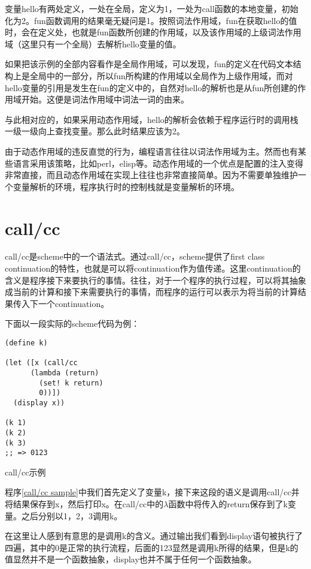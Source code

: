变量hello有两处定义，一处在全局，定义为1，一处为call函数的本地变量，初始化为2。fun函数调用的结果毫无疑问是1。按照词法作用域，fun在获取hello的值时，会在定义处，也就是fun函数所创建的作用域，以及该作用域的上级词法作用域（这里只有一个全局）去解析hello变量的值。

如果把该示例的全部内容看作是全局作用域，可以发现，fun的定义在代码文本结构上是全局中的一部分，所以fun所构建的作用域以全局作为上级作用域，而对hello变量的引用是发生在fun的定义中的，自然对hello的解析也是从fun所创建的作用域开始。这便是词法作用域中词法一词的由来。

与此相对应的，如果采用动态作用域，hello的解析会依赖于程序运行时的调用栈一级一级向上查找变量。那么此时结果应该为2。

由于动态作用域的违反直觉的行为，编程语言往往以词法作用域为主。然而也有某些语言采用该策略，比如perl，elisp等。动态作用域的一个优点是配置的注入变得非常直接，而且动态作用域在实现上往往也非常直接简单。因为不需要单独维护一个变量解析的环境，程序执行时的控制栈就是变量解析的环境。

\section{call/cc}

call/cc是scheme中的一个语法式。通过call/cc，scheme提供了first class continuation的特性，也就是可以将continuation作为值传递。这里continuation的含义是程序接下来要执行的事情。往往，对于一个程序的执行过程，可以将其抽象成当前的计算和接下来需要执行的事情，而程序的运行可以表示为将当前的计算结果传入下一个continuation。

下面以一段实际的scheme代码为例：

\begin{code}
\begin{verbatim}
(define k)

(let ([x (call/cc
	  (lambda (return)
	    (set! k return)
	    0))])
  (display x))

(k 1)
(k 2)
(k 3)
;; => 0123
\end{verbatim}
\caption{call/cc示例}
\label{call/cc sample}
\end{code}

程序\ref{call/cc sample}中我们首先定义了变量k，接下来这段的语义是调用call/cc并将结果保存到x，然后打印x。在call/cc中的$\lambda$函数中将传入的return保存到了k变量。之后分别以1，2，3调用k。

在这里让人感到有意思的是调用k的含义。通过输出我们看到display语句被执行了四遍，其中的0是正常的执行流程，后面的123显然是调用k所得的结果，但是k的值显然并不是一个函数抽象，display也并不属于任何一个函数抽象。

